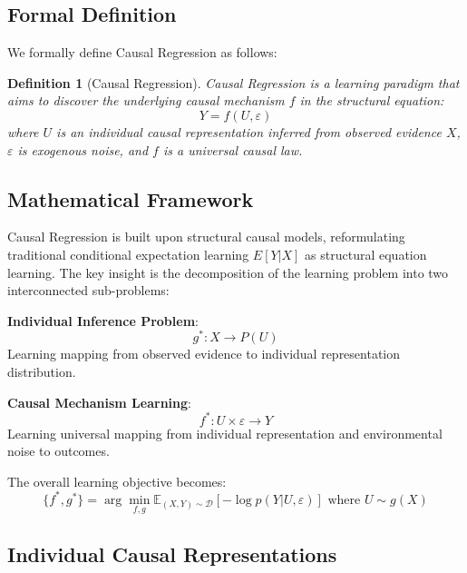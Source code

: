 \documentclass[conference]{IEEEtran}
\newtheorem{definition}{Definition}[section]
\newcommand{\expectation}{\mathbb{E}}
\begin{document}
\subsection{Formal Definition}

We formally define Causal Regression as follows:

\begin{definition}[Causal Regression]
Causal Regression is a learning paradigm that aims to discover the underlying causal mechanism $f$ in the structural equation:
\begin{equation}
Y = f(U, \varepsilon)
\end{equation}
where $U$ is an individual causal representation inferred from observed evidence $X$, $\varepsilon$ is exogenous noise, and $f$ is a universal causal law.
\end{definition}

\subsection{Mathematical Framework}

Causal Regression is built upon structural causal models, reformulating traditional conditional expectation learning $E[Y|X]$ as structural equation learning. The key insight is the decomposition of the learning problem into two interconnected sub-problems:

\textbf{Individual Inference Problem}:
\begin{equation}
g^*: X \rightarrow P(U)
\end{equation}
Learning mapping from observed evidence to individual representation distribution.

\textbf{Causal Mechanism Learning}:
\begin{equation}
f^*: U \times \varepsilon \rightarrow Y  
\end{equation}
Learning universal mapping from individual representation and environmental noise to outcomes.

The overall learning objective becomes:
\begin{equation}
\{f^*, g^*\} = \arg\min_{f,g} \expectation_{(X,Y) \sim \mathcal{D}}[-\log p(Y|U,\varepsilon)] \text{ where } U \sim g(X)
\end{equation}

\subsection{Individual Causal Representations}
\end{document}
